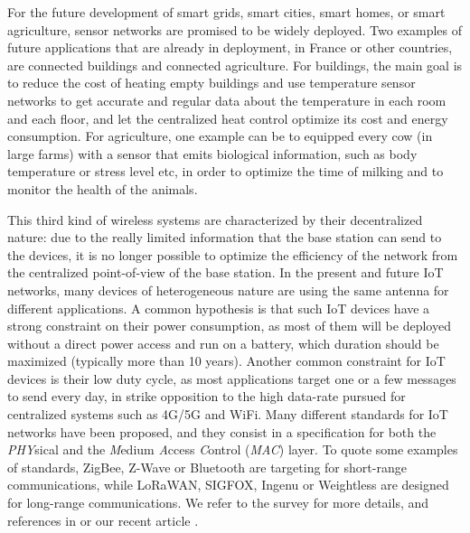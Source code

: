 For the future development of smart grids, smart cities, smart homes, or smart agriculture, sensor networks are promised to be widely deployed.
Two examples of future applications that are already in deployment, in France or other countries, are connected buildings and connected agriculture.
For buildings, the main goal is to reduce the cost of heating empty buildings and use temperature sensor networks to get accurate and regular data about the temperature in each room and each floor, and let the centralized heat control optimize its cost and energy consumption.
For agriculture, one example can be to equipped every cow (in large farms) with a sensor that emits biological information, such as body temperature or stress level etc, in order to optimize the time of milking and to monitor the health of the animals.
%

This third kind of wireless systems are characterized by their decentralized nature: due to the really limited information that the base station can send to the devices, it is no longer possible to optimize the efficiency of the network from the centralized point-of-view of the base station.
In the present and future IoT networks, many devices of heterogeneous nature are using the same antenna for different applications.
A common hypothesis is that such IoT devices have a strong constraint on their power consumption, as most of them will be deployed without a direct power access and run on a battery, which duration should be maximized (typically more than 10 years).
Another common constraint for IoT devices is their low duty cycle, as most applications target one or a few messages to send every day, in strike opposition to the high data-rate pursued for centralized systems such as 4G/5G and WiFi.
%
Many different standards for IoT networks have been proposed,
and they consist in a specification for both the \emph{PHY}sical
and the \emph{M}edium \emph{A}ccess \emph{C}ontrol (\emph{MAC}) layer.
To quote some examples of standards, ZigBee, Z-Wave or Bluetooth are targeting for short-range communications, while LoRaWAN, SIGFOX, Ingenu or Weightless are designed for long-range communications.
We refer to the survey \cite{Centenaro16} for more details, and references in \cite{Azari18} or our recent article \cite{MoyBesson2019}.



